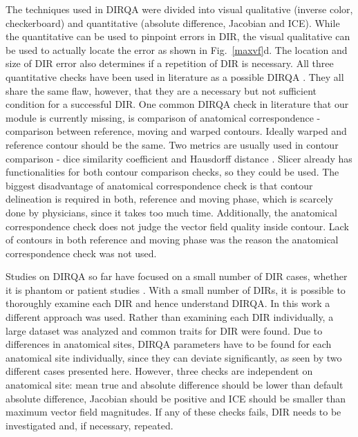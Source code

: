 \documentclass[type=dr, dr=rernat, accentcolor=tud7b,colorbacktitle, bigchapter, openright, twoside, 12pt ]{tudthesis}
\begin{document}
The techniques used in DIRQA were divided into visual qualitative (inverse color, checkerboard) and quantitative (absolute difference, Jacobian and ICE). While the quantitative can be used to pinpoint errors in DIR, the visual qualitative
can be used to actually locate the error as shown in Fig.~\ref{maxvf}d. The location and size of DIR error also determines if a repetition of DIR is necessary.
All three quantitative checks have been used in literature as a possible DIRQA \cite{Varadhan2013, Leow2007, Christensen2001, Bender2009}.
They all share the same flaw, however, that they are a necessary but not sufficient condition for a successful DIR. 
One common DIRQA check in literature that our module is currently missing, is comparison of anatomical correspondence - 
comparison between reference, moving and warped contours. Ideally warped and reference contour should be the same. Two metrics are usually used in contour comparison -
dice similarity coefficient \cite{Varadhan2013} and Hausdorff distance \cite{Huttenlocher1993}. Slicer already has functionalities for both contour comparison checks, so they could be used. 
The biggest disadvantage of anatomical correspondence check is that contour delineation is required in both, reference and moving phase, which is scarcely done by physicians, 
since it takes too much time. Additionally, the anatomical correspondence check does not judge the vector field quality inside contour.
Lack of contours in both reference and moving phase was the reason the anatomical correspondence check was not used.

Studies on DIRQA so far have focused on a small number of DIR cases, whether it is phantom \cite{Mutic2001,Moore2004} or patient studies \cite{Wu2008, Varadhan2013}. With a small number of DIRs,
it is possible to thoroughly examine each DIR and hence understand DIRQA. In this work a different approach was
used. Rather than examining each DIR individually, a large dataset was analyzed and common traits for DIR were found. Due to differences in anatomical sites, 
DIRQA parameters have to be found for each anatomical site individually, since they can
deviate significantly, as seen by two different cases presented here. However, three checks are independent on anatomical site: mean true and absolute difference should be lower than 
default absolute difference, Jacobian should be positive and ICE should be smaller than maximum vector field magnitudes. 
If any of these checks fails, DIR needs to be investigated and, if necessary, repeated.
\end{document}
